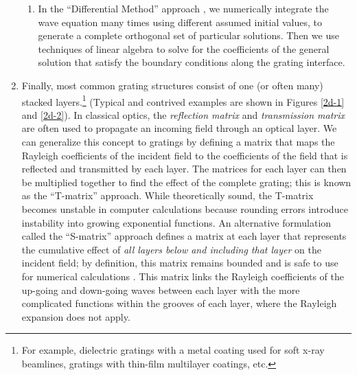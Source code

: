 \begin{enumerate}
\begin{enumerate}
	\item In the ``Differential Method'' approach \cite{Pop00}, we numerically integrate the wave equation many times using different assumed initial values, to generate a complete orthogonal set of particular solutions. Then we use techniques of linear algebra to solve for the coefficients of the general solution that satisfy the boundary conditions along the grating interface.
	\end{enumerate}
\item Finally, most common grating structures consist of one (or often many) stacked layers.\footnote{For example, dielectric gratings with a metal coating used for soft x-ray beamlines, gratings with thin-film multilayer coatings, etc.} (Typical and contrived examples are shown in Figures \ref{2d-1} and \ref{2d-2}).  In classical optics, the \emph{reflection matrix} and \emph{transmission matrix} are often used to propagate an incoming field through an optical layer.  We can generalize this concept to gratings by defining a matrix that maps the Rayleigh coefficients of the incident field to the coefficients of the field that is reflected and transmitted by each layer.  The matrices for each layer can then be multiplied together to find the effect of the complete grating; this is known as the ``T-matrix'' approach.  While theoretically sound, the T-matrix becomes unstable in computer calculations because rounding errors introduce instability into growing exponential functions.  An alternative formulation called the ``S-matrix'' approach defines a matrix at each layer that represents the cumulative effect of \emph{all layers below and including that layer} on the incident field; by definition, this matrix remains bounded and is safe to use for numerical calculations \cite{Li96}.  This matrix links the Rayleigh coefficients of the up-going and down-going waves between each layer with the more complicated functions within the grooves of each layer, where the Rayleigh expansion does not apply. 
\end{enumerate}

